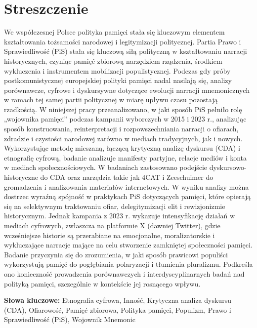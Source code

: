 \section*{Streszczenie}
We współczesnej Polsce polityka pamięci stała się kluczowym elementem kształtowania tożsamości narodowej i legitymizacji politycznej. Partia Prawo i Sprawiedliwość (PiS) stała się kluczową siłą polityczną w kształtowaniu narracji historycznych, czyniąc pamięć zbiorową narzędziem rządzenia, środkiem wykluczenia i instrumentem mobilizacji populistycznej. Podczas gdy próby postkomunistycznej europejskiej polityki pamięci nadal nasilają się, analizy porównawcze, cyfrowe i dyskursywne dotyczące ewolucji narracji mnemonicznych w ramach tej samej partii politycznej w miarę upływu czasu pozostają rzadkością. W niniejszej pracy przeanalizowano, w jaki sposób PiS pełniło rolę „wojownika pamięci” podczas kampanii wyborczych w 2015 i 2023 r., analizując sposób konstruowania, reinterpretacji i rozpowszechniania narracji o ofiarach, zdradzie i czystości narodowej zarówno w mediach tradycyjnych, jak i nowych. Wykorzystując metodę mieszaną, łączącą krytyczną analizę dyskursu (CDA) i etnografię cyfrową, badanie analizuje manifesty partyjne, relacje mediów i konta w mediach społecznościowych. W badaniach zastosowano podejście dyskursowo-historyczne do CDA oraz narzędzia takie jak 4CAT i Zeeschuimer do gromadzenia i analizowania materiałów internetowych. W wyniku analizy można dostrzec wyraźną spójność w praktykach PiS dotyczących pamięci, które opierają się na selektywnym traktowaniu ofiar, delegitymizacji elit i rewizjonizmie historycznym. Jednak kampania z 2023 r. wykazuje intensyfikację działań w mediach cyfrowych, zwłaszcza na platformie X (dawniej Twitter), gdzie wcześniejsze historie są przerabiane na emocjonalne, moralizatorskie i wykluczające narracje mające na celu stworzenie zamkniętej społeczności pamięci. Badanie przyczynia się do zrozumienia, w jaki sposób prawicowi populiści wykorzystują pamięć do pogłębiania polaryzacji i tłumienia pluralizmu. Podkreśla ono konieczność prowadzenia porównawczych i interdyscyplinarnych badań nad polityką pamięci, szczególnie w kontekście jej rosnącego wpływu.

\vfill

\noindent\textbf{Słowa kluczowe:} Etnografia cyfrowa, Inność, Krytyczna analiza dyskursu (CDA), Ofiarowość, Pamięć zbiorowa, Polityka pamięci, Populizm, Prawo i Sprawiedliwość (PiS), Wojownik Mnemonic